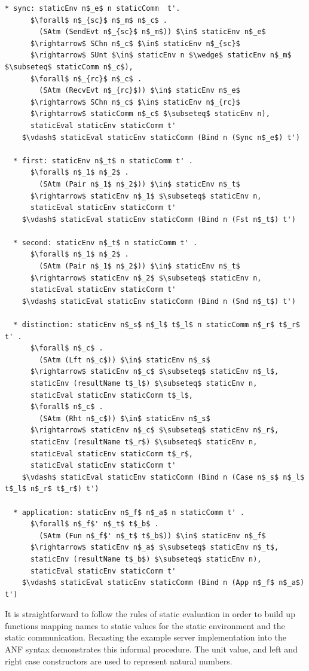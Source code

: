 \documentclass[letterpaper, 11pt]{report}
\begin{document}
\begin{lstlisting}[language=logic, mathescape]
  * sync: staticEnv n$_e$ n staticComm  t'.
      $\forall$ n$_{sc}$ n$_m$ n$_c$ . 
        (SAtm (SendEvt n$_{sc}$ n$_m$)) $\in$ staticEnv n$_e$
      $\rightarrow$ SChn n$_c$ $\in$ staticEnv n$_{sc}$ 
      $\rightarrow$ SUnt $\in$ staticEnv n $\wedge$ staticEnv n$_m$ $\subseteq$ staticComm n$_c$),
      $\forall$ n$_{rc}$ n$_c$ . 
        (SAtm (RecvEvt n$_{rc}$)) $\in$ staticEnv n$_e$
      $\rightarrow$ SChn n$_c$ $\in$ staticEnv n$_{rc}$ 
      $\rightarrow$ staticComm n$_c$ $\subseteq$ staticEnv n),
      staticEval staticEnv staticComm t'
    $\vdash$ staticEval staticEnv staticComm (Bind n (Sync n$_e$) t')

  * first: staticEnv n$_t$ n staticComm t' . 
      $\forall$ n$_1$ n$_2$ .
        (SAtm (Pair n$_1$ n$_2$)) $\in$ staticEnv n$_t$
      $\rightarrow$ staticEnv n$_1$ $\subseteq$ staticEnv n,
      staticEval staticEnv staticComm t'
    $\vdash$ staticEval staticEnv staticComm (Bind n (Fst n$_t$) t')

  * second: staticEnv n$_t$ n staticComm t' . 
      $\forall$ n$_1$ n$_2$ . 
        (SAtm (Pair n$_1$ n$_2$)) $\in$ staticEnv n$_t$
      $\rightarrow$ staticEnv n$_2$ $\subseteq$ staticEnv n,
      staticEval staticEnv staticComm t'
    $\vdash$ staticEval staticEnv staticComm (Bind n (Snd n$_t$) t')

  * distinction: staticEnv n$_s$ n$_l$ t$_l$ n staticComm n$_r$ t$_r$ t' . 
      $\forall$ n$_c$ . 
        (SAtm (Lft n$_c$)) $\in$ staticEnv n$_s$
      $\rightarrow$ staticEnv n$_c$ $\subseteq$ staticEnv n$_l$,
      staticEnv (resultName t$_l$) $\subseteq$ staticEnv n,
      staticEval staticEnv staticComm t$_l$,
      $\forall$ n$_c$ . 
        (SAtm (Rht n$_c$)) $\in$ staticEnv n$_s$
      $\rightarrow$ staticEnv n$_c$ $\subseteq$ staticEnv n$_r$, 
      staticEnv (resultName t$_r$) $\subseteq$ staticEnv n, 
      staticEval staticEnv staticComm t$_r$,
      staticEval staticEnv staticComm t'
    $\vdash$ staticEval staticEnv staticComm (Bind n (Case n$_s$ n$_l$ t$_l$ n$_r$ t$_r$) t')

  * application: staticEnv n$_f$ n$_a$ n staticComm t' . 
      $\forall$ n$_f$' n$_t$ t$_b$ . 
        (SAtm (Fun n$_f$' n$_t$ t$_b$)) $\in$ staticEnv n$_f$
      $\rightarrow$ staticEnv n$_a$ $\subseteq$ staticEnv n$_t$, 
      staticEnv (resultName t$_b$) $\subseteq$ staticEnv n),
      staticEval staticEnv staticComm t'
    $\vdash$ staticEval staticEnv staticComm (Bind n (App n$_f$ n$_a$) t')
\end{lstlisting}

It is straightforward to follow the rules of static evaluation in order to build up
functions mapping names to static values for the static environment
and the static communication.
Recasting the example server implementation into the ANF syntax demonstrates this informal procedure.
The unit value, and left and right case constructors are used to represent natural numbers.
\end{document}

